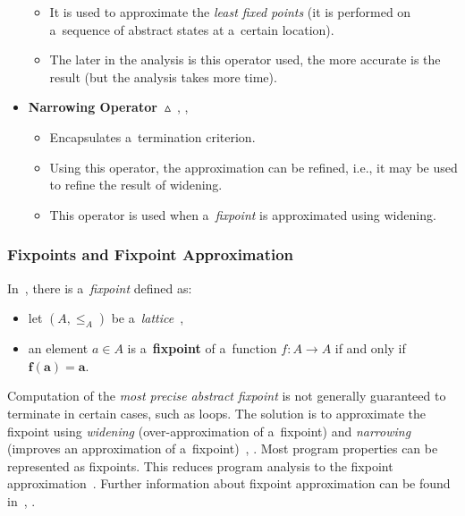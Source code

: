 \begin{itemize}
\begin{itemize}
            \item
                It is used to approximate the \emph{least fixed points}
                (it is performed on a~sequence of abstract states at
                a~certain location).

            \item
                The later in the analysis is this operator used, the more
                accurate is the result (but the analysis takes more time).
        \end{itemize}

    \item
        \textbf{Narrowing
        Operator~$ \vartriangle $}~\cite{programAnalysisNielson},
        \cite{wideningNarrowingCousot}, \cite{favAI}
        \begin{itemize}
            \item
                Encapsulates a~termination criterion.

            \item
                Using this operator, the approximation can be refined, i.e.,
                it may be used to refine the result of widening.

            \item
                This operator is used when a~\emph{fixpoint} is
                approximated using widening.
        \end{itemize}
\end{itemize}

\subsubsection{Fixpoints and Fixpoint Approximation}

\begin{definition}
    In~\cite{favLatticesAndFixpoints}, there is a~\emph{fixpoint} defined as:
    \begin{itemize}
        \item
            let $ (A, \leq_A) $ be
            a~\emph{lattice}~\cite{favLatticesAndFixpoints},

        \item
            an element $ a \in A $ is a~\textbf{fixpoint} of a~function
            $ f : A \rightarrow A $ if and only if $ \boldsymbol{f(a) = a} $.
    \end{itemize}
\end{definition}

Computation of the \emph{most precise abstract fixpoint} is not generally
guaranteed to terminate in certain cases, such as loops. The solution is
to approximate the fixpoint using \emph{widening} (over-approximation of
a~fixpoint) and \emph{narrowing} (improves an approximation of
a~fixpoint)~\cite{favAI}, \cite{projectPracticeMarcin2018}.
Most program properties can be represented as fixpoints. This reduces program
analysis to the fixpoint approximation~\cite{AICousotWeb}. Further
information about fixpoint approximation can be found
in~\cite{programAnalysisNielson}, \cite{wideningNarrowingCousot}.

